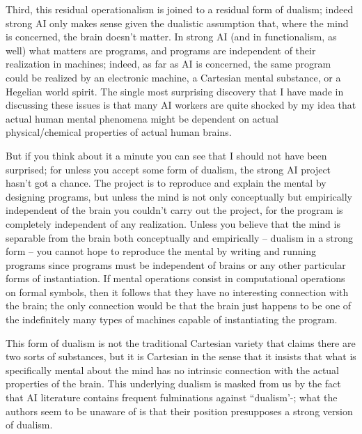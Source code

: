 Third, this residual operationalism is joined to a residual form of dualism; indeed strong AI only makes sense
given the dualistic assumption that, where the mind is concerned, the brain doesn't matter. In strong AI (and in
functionalism, as well) what matters are programs, and programs are independent of their realization in
machines; indeed, as far as AI is concerned, the same program could be realized by an electronic machine, a
Cartesian mental substance, or a Hegelian world spirit. The single most surprising discovery that I have made in
discussing these issues is that many AI workers are quite shocked by my idea that actual human mental
phenomena might be dependent on actual physical/chemical properties of actual human brains.

But if you think about it a minute you can see that I should not have been surprised; for unless you accept some form of dualism, the strong AI project hasn't got a chance. The project is to reproduce and explain the mental
by designing programs, but unless the mind is not only conceptually but empirically independent of the brain you
couldn't carry out the project, for the program is completely independent of any realization. Unless you believe
that the mind is separable from the brain both conceptually and empirically -- dualism in a strong form -- you
cannot hope to reproduce the mental by writing and running programs since programs must be independent of
brains or any other particular forms of instantiation. If mental operations consist in computational operations on
formal symbols, then it follows that they have no interesting connection with the brain; the only connection
would be that the brain just happens to be one of the indefinitely many types of machines capable of instantiating
the program.

This form of dualism is not the traditional Cartesian variety that claims there are two sorts of substances, but it
is Cartesian in the sense that it insists that what is specifically mental about the mind has no intrinsic connection
with the actual properties of the brain. This underlying dualism is masked from us by the fact that AI literature
contains frequent fulminations against ``dualism'-; what the authors seem to be unaware of is that their position
presupposes a strong version of dualism.

